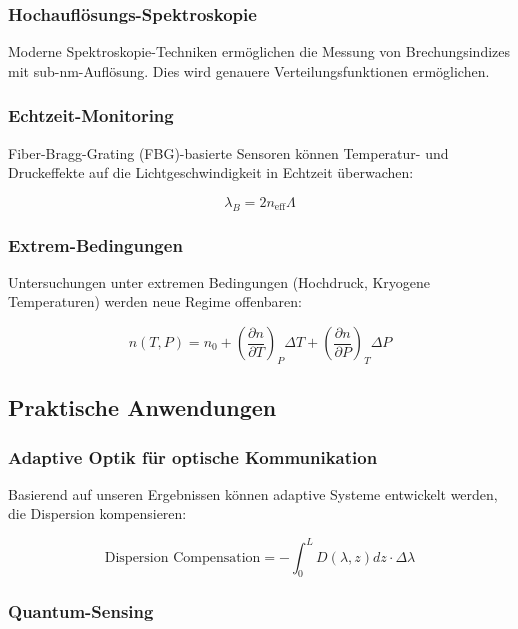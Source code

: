 \documentclass[12pt,a4paper,oneside]{article}
\theoremstyle{definition}
\theoremstyle{remark}
\begin{document}
\subsubsection{Hochauflösungs-Spektroskopie}

Moderne Spektroskopie-Techniken ermöglichen die Messung von Brechungsindizes mit sub-nm-Auflösung. Dies wird genauere Verteilungsfunktionen ermöglichen.

\subsubsection{Echtzeit-Monitoring}

Fiber-Bragg-Grating (FBG)-basierte Sensoren können Temperatur- und Druckeffekte auf die Lichtgeschwindigkeit in Echtzeit überwachen:

\begin{equation}
    \lambda_B = 2 n_{\text{eff}} \Lambda
\end{equation}

\subsubsection{Extrem-Bedingungen}

Untersuchungen unter extremen Bedingungen (Hochdruck, Kryogene Temperaturen) werden neue Regime offenbaren:

\begin{equation}
    n(T, P) = n_0 + \left(\frac{\partial n}{\partial T}\right)_P \Delta T + \left(\frac{\partial n}{\partial P}\right)_T \Delta P
\end{equation}

\subsection{Praktische Anwendungen}

\subsubsection{Adaptive Optik für optische Kommunikation}

Basierend auf unseren Ergebnissen können adaptive Systeme entwickelt werden, die Dispersion kompensieren:

\begin{equation}
    \text{Dispersion Compensation} = -\int_0^L D(\lambda, z) dz \cdot \Delta \lambda
\end{equation}

\subsubsection{Quantum-Sensing}
\end{document}
